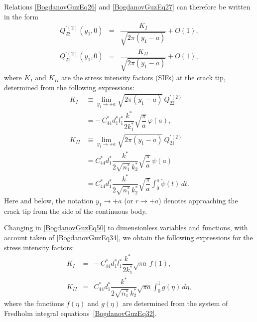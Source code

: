 Relations \eqref{BogdanovGuzEq26} and \eqref{BogdanovGuzEq27} can therefore be written in the form
\begin{equation}
	\label{BogdanovGuzEq49}
	\begin{array}{rcl}
		Q_{22}^{\prime(2)}(y_{1},0)
		&=&
		\dfrac{K_{I}}{\sqrt{2\pi (y_{1}-a)}}+O(1),
		\\[6pt]
		Q_{21}^{\prime(2)}(y_{1},0)
		&=&
		\dfrac{K_{II}}{\sqrt{2\pi (y_{1}-a)}}+O(1),
	\end{array}
\end{equation}
where $K_{I}$ and $K_{II}$ are the stress intensity factors (SIFs) at the crack
tip, determined from the following expressions:
\begin{equation}
	\label{BogdanovGuzEq50}
	\begin{aligned}		
		K_{I}
		&\equiv
		\displaystyle
		\lim_{y_{1}\to +a}
		\sqrt{2\pi (y_{1}-a)}\,Q_{22}^{\prime(2)}
		\\
		&
		\displaystyle
		=
		-\,C_{44}^{*} d_{1}^{*} l_{1}^{*}
		\dfrac{k^{*}}{2k_{1}^{*}}
		\sqrt{\dfrac{\pi}{a}}\,
		\varphi(a),
		\\
		K_{II}
		&\equiv
			\displaystyle
			\lim_{y_{1}\to +a}
			\sqrt{2\pi (y_{1}-a)}\,Q_{21}^{\prime(2)}
			\\
			&
			=
			C_{44}^{*} d_{1}^{*}
			\dfrac{k^{*}}{2\sqrt{n_{1}^{*}}\,k_{2}^{*}}
			\sqrt{\dfrac{\pi}{a}}\,
			\psi(a)
			\\
			&
			=
			\displaystyle
			C_{44}^{*} d_{1}^{*}
			\dfrac{k^{*}}{2\sqrt{n_{1}^{*}}\,k_{2}^{*}}
			\sqrt{\dfrac{\pi}{a}}
			\int_{0}^{a}\tilde{\psi}(t)\,dt .
	\end{aligned}
\end{equation}
%
Here and below, the notation $y_{1}\to +a$ (or $r\to +a$) denotes approaching
the crack tip from the side of the continuous body.

Changing in \eqref{BogdanovGuzEq50} to dimensionless variables and functions,
with account taken of \eqref{BogdanovGuzEq34}, we obtain the following
expressions for the stress intensity factors:
\begin{equation}
	\label{BogdanovGuzEq51}
	\begin{array}{rcl}
		K_{I}
		&=&
		-\,C_{44}^{*} d_{1}^{*} l_{1}^{*}
		\dfrac{k^{*}}{2k_{1}^{*}}
		\sqrt{\pi a}\,
		f(1),
		\\[8pt]
		K_{II}
		&=&
		C_{44}^{*} d_{1}^{*}
		\dfrac{k^{*}}{2\sqrt{n_{1}^{*}}\,k_{2}^{*}}
		\sqrt{\pi a}
		\displaystyle\int_{0}^{1} g(\eta)\,d\eta ,
	\end{array}
\end{equation}
where the functions $f(\eta)$ and $g(\eta)$ are determined from the system of
Fredholm integral equations~\eqref{BogdanovGuzEq32}.

